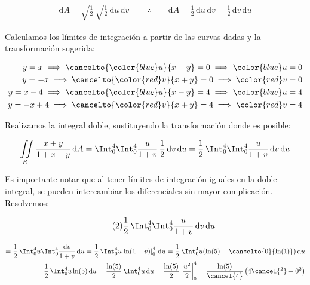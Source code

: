 \documentclass[12pt]{article}
\begin{document}
\begin{align*}
	\mathrm{d}A = \sqrt{\frac{1}{2}}\,\sqrt{\frac{1}{2}}\, \mathrm{d}u\,\mathrm{d}v\, \qquad \therefore \qquad \mathrm{d}A = \frac{1}{2}\,\mathrm{d}u\,\mathrm{d}v = \frac{1}{2}\,\mathrm{d}v\,\mathrm{d}u
\end{align*}

\noindent Calculamos los límites de integración a partir de las curvas dadas y la transformación sugerida:

\begin{align*}
	y = x  \implies \cancelto{{\color{blue}u}}{x-y} = 0 \implies {\color{blue}u} = 0 \\
	y = -x \implies \cancelto{{\color{red}v}}{x+y} = 0 \implies {\color{red}v} = 0 \\
	y = x - 4 \implies \cancelto{{\color{blue}u}}{x-y} = 4 \implies {\color{blue}u} = 4 \\
	y = -x + 4 \implies \cancelto{{\color{red}v}}{x+y} = 4 \implies {\color{red}v} = 4 \\
\end{align*}

\noindent Realizamos la integral doble, sustituyendo la transformación donde es posible:

\begin{equation*}
	 \iint\limits_R \frac{x+y}{1+x-y}\, \mathrm{d}A = \Int_0^4\Int_0^4 \frac{u}{1+v}\, \frac{1}{2}\,\mathrm{d}v\,\mathrm{d}u = \frac{1}{2}\,\Int_0^4\Int_0^4 \frac{u}{1+v}\, \mathrm{d}v\,\mathrm{d}u 
\end{equation*}

\noindent Es importante notar que al tener límites de integración iguales en la doble integral, se pueden intercambiar los diferenciales sin mayor complicación. Resolvemos:

\begin{equation}\label{eqn:9-2}\tag{2}
	\frac{1}{2}\,\Int_0^4\Int_0^4 \frac{u}{1+v}\, \mathrm{d}v\,\mathrm{d}u
\end{equation}

\begin{align*}
	= \frac{1}{2}\,\Int_0^4 u \Int_0^4 \frac{\mathrm{d}v}{1+v}\, \mathrm{d}u
	= \frac{1}{2}\,\Int_0^4 u \left.\ln(1+v)\right|_0^4\, \mathrm{d}u = \frac{1}{2}\,\Int_0^4 u( \ln(5)-\cancelto{0}{\ln(1)})\, \mathrm{d}u \\
	= \frac{1}{2}\,\Int_0^4 u \ln(5)\, \mathrm{d}u = \frac{\ln(5)}{2}\,\Int_0^4 u\, \mathrm{d}u = \frac{\ln(5)}{2}\, \left.\frac{u^2}{2}\right|_0^4 = \frac{\ln(5)}{\cancel{4}}\left(4\cancel{^2}-0^2\right)
\end{align*}
\end{document}
